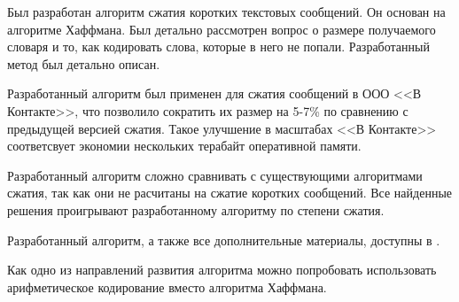 \startconclusionpage

Был разработан алгоритм сжатия коротких текстовых сообщений. Он основан на алгоритме Хаффмана. Был детально рассмотрен вопрос о размере получаемого словаря и то, как кодировать слова, которые в него не попали. Разработанный метод был детально описан.

Разработанный алгоритм был применен для сжатия сообщений в ООО <<В Контакте>>, что позволило сократить их размер на 5-7\% по сравнению с предыдущей версией сжатия. Такое улучшение в масштабах <<В Контакте>> соответсвует экономии нескольких терабайт оперативной памяти.

Разработанный алгоритм сложно сравнивать с существующими алгоритмами сжатия, так как они не расчитаны на сжатие коротких сообщений. Все найденные решения проигрывают разработанному алгоритму по степени сжатия.

Разработанный алгоритм, а также все дополнительные материалы, доступны в \cite{github}.

Как одно из направлений развития алгоритма можно попробовать использовать арифметическое кодирование вместо алгоритма Хаффмана.